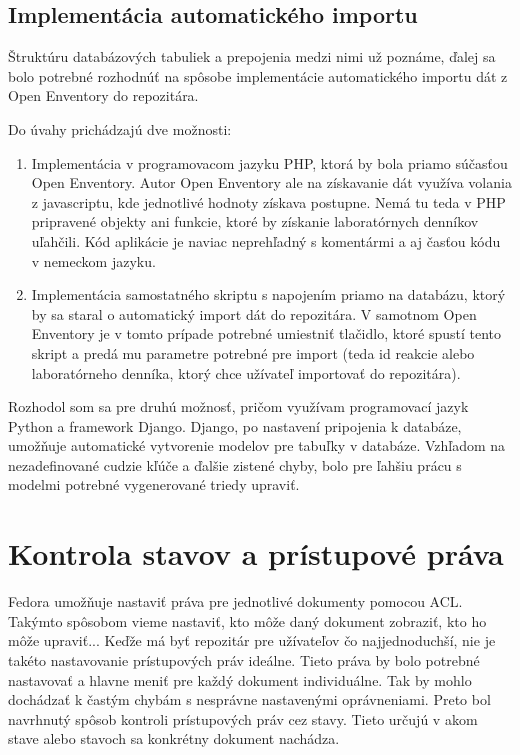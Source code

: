 \documentclass[thesis=M,slovak]{FITthesis}[2013/05/06]
\begin{document}
\subsection{Implementácia automatického importu}
Štruktúru databázových tabuliek a prepojenia medzi nimi už poznáme, ďalej sa bolo potrebné rozhodnúť na spôsobe implementácie automatického importu dát z Open Enventory do repozitára.

Do úvahy prichádzajú dve možnosti:
\begin{enumerate}
	\item Implementácia v programovacom jazyku PHP, ktorá by bola priamo súčasťou Open Enventory. Autor Open Enventory ale na získavanie dát využíva volania z javascriptu, kde jednotlivé hodnoty získava postupne. Nemá tu teda v PHP pripravené objekty ani funkcie, ktoré by získanie laboratórnych denníkov uľahčili. Kód aplikácie je naviac neprehľadný s komentármi a aj časťou kódu v nemeckom jazyku.
	\item Implementácia samostatného skriptu s napojením priamo na databázu, ktorý by sa staral o automatický import dát do repozitára. V samotnom Open Enventory je v tomto prípade potrebné umiestniť tlačidlo, ktoré spustí tento skript a predá mu parametre potrebné pre import (teda id reakcie alebo laboratórneho denníka, ktorý chce užívateľ importovať do repozitára).
\end{enumerate}

Rozhodol som sa pre druhú možnosť, pričom využívam programovací jazyk Python a framework Django. Django, po nastavení pripojenia k databáze, umožňuje automatické vytvorenie modelov pre tabuľky v databáze. Vzhľadom na nezadefinované cudzie kľúče a ďalšie zistené chyby, bolo pre ľahšiu prácu s modelmi potrebné vygenerované triedy upraviť.

\section{Kontrola stavov a prístupové práva} \label{stavy}
Fedora umožňuje nastaviť práva pre jednotlivé dokumenty pomocou ACL. Takýmto spôsobom vieme nastaviť, kto môže daný dokument zobraziť, kto ho môže upraviť... Keďže má byť repozitár pre užívateľov čo najjednoduchší, nie je takéto nastavovanie prístupových práv ideálne. Tieto práva by bolo potrebné nastavovať a hlavne meniť pre každý dokument individuálne. Tak by mohlo dochádzať k častým chybám s nesprávne nastavenými oprávneniami. Preto bol navrhnutý spôsob kontroli prístupových práv cez stavy. Tieto určujú v akom stave alebo stavoch sa konkrétny dokument nachádza.
\end{document}
